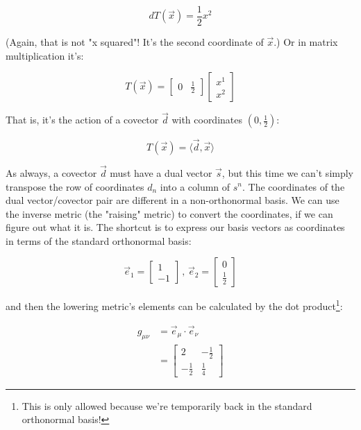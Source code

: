 \begin{equation}
    dT(\vec{x}) = \frac{1}{2}x^2
    \label{eqn:t-rel-awk}
\end{equation}

(Again, that is not "x squared"! It's the second coordinate of $\vec{x}$.) Or in matrix multiplication it's:

\begin{equation}
    T(\vec{x}) = 
    \begin{bmatrix}0 & \frac{1}{2}\end{bmatrix}
    \begin{bmatrix}x^1 \\ x^2\end{bmatrix}
    \label{eqn:t-rel-matrices-awk}
\end{equation}

That is, it's the action of a covector $\vec{d}$ with coordinates $(0, \frac{1}{2})$:

$$
T(\vec{x}) = \langle \vec{d}, \vec{x} \rangle
$$

As always, a covector $\vec{d}$ must have a dual vector $\vec{s}$, but this time we can't simply transpose the row of coordinates $d_n$ into a column of $s^n$. The coordinates of the dual vector/covector pair are different in a non-orthonormal basis. We can use the inverse metric (the "raising" metric) to convert the coordinates, if we can figure out what it is. The shortcut is to express our basis vectors as coordinates in terms of the standard orthonormal basis:

$$
\vec{e}_1 = \begin{bmatrix}
    1 \\
    -1
\end{bmatrix}
\, , \,
\vec{e}_2 = \begin{bmatrix}
    0 \\
    \frac{1}{2}
\end{bmatrix}
$$

and then the lowering metric's elements can be calculated by the dot product\footnote{This is only allowed because we're temporarily back in the standard orthonormal basis!}:

\begin{equation}
\begin{split}
    g_{\mu\nu} &= \vec{e}_{\mu} \cdot \vec{e}_{\nu} \\
    &= \begin{bmatrix}
        2 & -\frac{1}{2} \\
        -\frac{1}{2} & \frac{1}{4}
        \end{bmatrix}
\end{split}
\end{equation}

